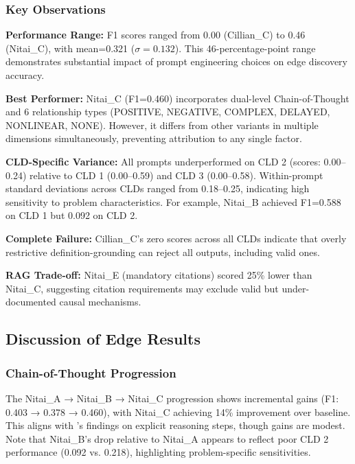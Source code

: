 \subsubsection{Key Observations}

\textbf{Performance Range:} F1 scores ranged from 0.00 (Cillian\_C) to 0.46 (Nitai\_C), with mean=0.321 (\(\sigma=0.132\)). This 46-percentage-point range demonstrates substantial impact of prompt engineering choices on edge discovery accuracy.

\textbf{Best Performer:} Nitai\_C (F1=0.460) incorporates dual-level Chain-of-Thought and 6 relationship types (POSITIVE, NEGATIVE, COMPLEX, DELAYED, NONLINEAR, NONE). However, it differs from other variants in multiple dimensions simultaneously, preventing attribution to any single factor.

\textbf{CLD-Specific Variance:} All prompts underperformed on CLD 2 (scores: 0.00--0.24) relative to CLD 1 (0.00--0.59) and CLD 3 (0.00--0.58). Within-prompt standard deviations across CLDs ranged from 0.18--0.25, indicating high sensitivity to problem characteristics. For example, Nitai\_B achieved F1=0.588 on CLD 1 but 0.092 on CLD 2.

\textbf{Complete Failure:} Cillian\_C's zero scores across all CLDs indicate that overly restrictive definition-grounding can reject all outputs, including valid ones.

\textbf{RAG Trade-off:} Nitai\_E (mandatory citations) scored 25\% lower than Nitai\_C, suggesting citation requirements may exclude valid but under-documented causal mechanisms.

\subsection{Discussion of Edge Results}

\subsubsection{Chain-of-Thought Progression}

The Nitai\_A → Nitai\_B → Nitai\_C progression shows incremental gains (F1: 0.403 → 0.378 → 0.460), with Nitai\_C achieving 14\% improvement over baseline. This aligns with \cite{wei2022chain}'s findings on explicit reasoning steps, though gains are modest. Note that Nitai\_B's drop relative to Nitai\_A appears to reflect poor CLD 2 performance (0.092 vs. 0.218), highlighting problem-specific sensitivities.

